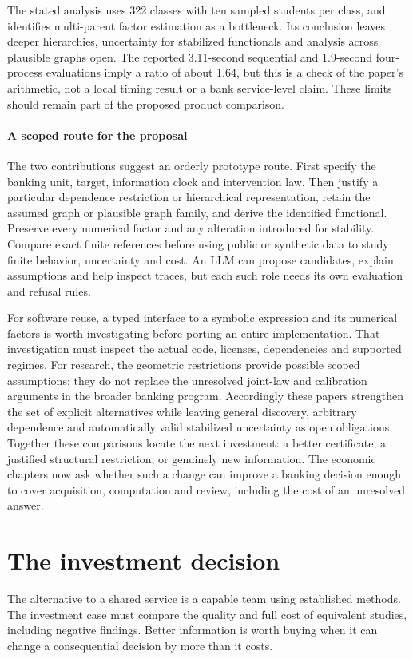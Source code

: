 The stated analysis uses 322 classes with ten sampled students per class,
and identifies multi-parent factor estimation as a bottleneck. Its
conclusion leaves deeper hierarchies, uncertainty for stabilized
functionals and analysis across plausible graphs open. The reported
3.11-second sequential and 1.9-second four-process evaluations imply a
ratio of about 1.64, but this is a check of the paper's arithmetic, not a
local timing result or a bank service-level claim. These limits should
remain part of the proposed product comparison.
\citep{exec23_hierarchical_pipeline,exec23_structured_reference}

\subsection{A scoped route for the proposal}
\label{exec23:structured-route}

The two contributions suggest an orderly prototype route. First specify
the banking unit, target, information clock and intervention law. Then
justify a particular dependence restriction or hierarchical representation,
retain the assumed graph or plausible graph family, and derive the
identified functional. Preserve every numerical factor and any alteration
introduced for stability. Compare exact finite references before using
public or synthetic data to study finite behavior, uncertainty and cost.
An LLM can propose candidates, explain assumptions and help inspect traces,
but each such role needs its own evaluation and refusal rules.

For software reuse, a typed interface to a symbolic expression and its
numerical factors is worth investigating before porting an entire
implementation. That investigation must inspect the actual code, licenses,
dependencies and supported regimes. For research, the geometric restrictions
provide possible scoped assumptions; they do not replace the unresolved
joint-law and calibration arguments in the broader banking program.
Accordingly these papers strengthen the set of explicit alternatives
while leaving general discovery, arbitrary dependence and automatically
valid stabilized uncertainty as open obligations. Together these comparisons locate the next investment: a better certificate, a justified structural restriction, or genuinely new information. The economic chapters now ask whether such a change can improve a banking decision enough to cover acquisition, computation and review, including the cost of an unresolved answer.



\part{The investment decision}
\label{reading:part-investment}
The alternative to a shared service is a capable team using established
methods. The investment case must compare the quality and full cost of
equivalent studies, including negative findings. Better information is worth
buying when it can change a consequential decision by more than it costs.



